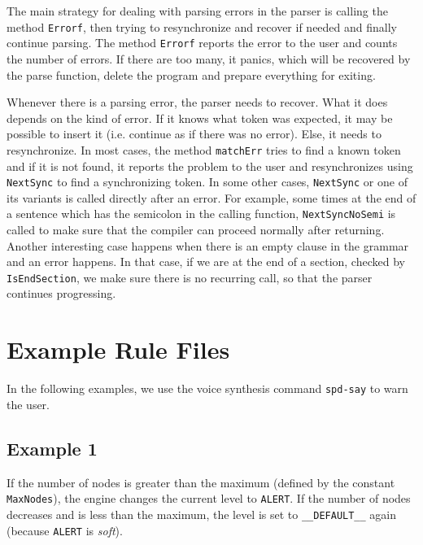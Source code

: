 \documentclass[a4paper]{article}
\begin{document}
The main strategy for dealing with parsing errors in the parser is calling the method
\verb+Errorf+, then  trying to resynchronize and recover if needed and finally continue parsing.
The method \verb+Errorf+ reports the error to the user and counts the number
of errors. If there are too many, it panics,
which will be recovered by the parse function, delete the program and prepare everything for
exiting.

Whenever there is a parsing error, the parser needs to recover. What it does depends on the kind of
error. If it knows what token was expected,
it may be possible to insert it (i.e. continue as if there was no error).
Else, it needs to resynchronize.
In most cases, the method \verb+matchErr+ tries to find a known token and if it is not found,
it reports the problem to the user and resynchronizes using \verb+NextSync+ to find a synchronizing token.
In some other cases, \verb+NextSync+ or one of its variants is called directly after an error.
For example, some times at the end of a sentence which has the semicolon in the calling function,
\verb+NextSyncNoSemi+ is called to make sure that the compiler can proceed normally after returning.
Another interesting case happens when there is an empty clause in the grammar and an error
happens. In that case, if we are at the end of a section, checked by \verb+IsEndSection+, we make
sure there is no recurring call, so that the parser continues progressing.


\appendix

\section{Example Rule Files \label{sec:examples}}

In the following examples, we use the voice synthesis command \texttt{spd-say} to
warn the user.

\subsection{Example 1}

If the number of nodes is greater than the maximum (defined by the
constant \texttt{MaxNodes}), the engine changes the current level to
\texttt{ALERT}.  If the number of nodes decreases and is less than
the maximum, the level is set to \texttt{\_\_DEFAULT\_\_} again (because
\texttt{ALERT} is \textit{soft}).
\end{document}
